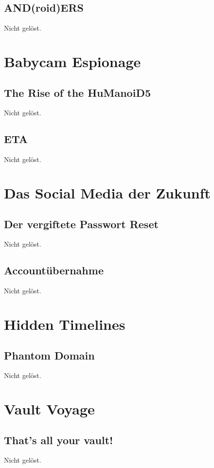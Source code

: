 \documentclass[12pt, a4paper, titlepage, oneside]{scrartcl}
\begin{document}
	\subsection{AND(roid)ERS}
	Nicht gelöst.

	\section{Babycam Espionage}

	\subsection{The Rise of the HuManoiD5}
	Nicht gelöst.

	\subsection{ETA}
	Nicht gelöst.

	\section{Das Social Media der Zukunft}

	\subsection{Der vergiftete Passwort Reset}
	Nicht gelöst.

	\subsection{Accountübernahme}
	Nicht gelöst.

	\section{Hidden Timelines}

	\subsection{Phantom Domain}
	Nicht gelöst.

	\section{Vault Voyage}

	\subsection{That's all your vault!}
	Nicht gelöst.
\end{document}
